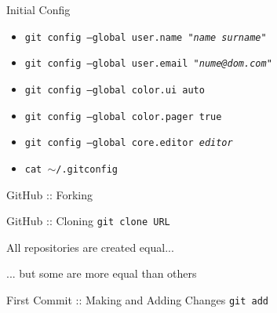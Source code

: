 \documentclass{beamer}
\begin{document}
\begin{frame}{Initial Config}
  \begin{itemize}
    \item \texttt{git config --global user.name "\textit{name surname}"}
    \item \texttt{git config --global user.email "\textit{nume@dom.com}"}
    \item \texttt{git config --global color.ui auto}
    \item \texttt{git config --global color.pager true}
    \item \texttt{git config --global core.editor \textit{editor}}
  \end{itemize}
  \pause
  \begin{itemize}
    \item \texttt{cat $\sim$/.gitconfig}
  \end{itemize}
\end{frame}

\begin{frame}{GitHub :: Forking}
  \begin{center}
  \end{center}
\end{frame}

\begin{frame}{GitHub :: Cloning}
  \texttt{git clone URL}
  \begin{center}
  \end{center}
\end{frame}

\begin{frame}{All repositories are created equal...}
  \begin{center}
  \end{center}
\end{frame}

\begin{frame}{... but some are more equal than others}
  \begin{center}
  \end{center}
\end{frame}

\begin{frame}{First Commit :: Making and Adding Changes}
  \texttt{git add}
  \begin{center}
  \end{center}
\end{frame}
\end{document}
